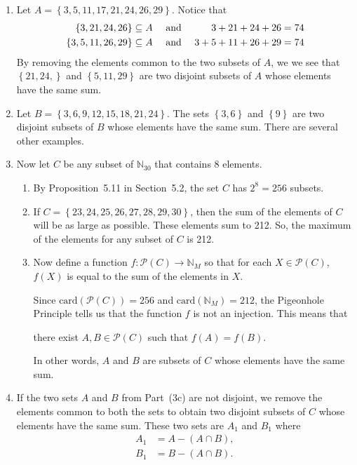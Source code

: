 \documentclass[11pt]{article}
\begin{document}
\begin{enumerate}
\item Let $A = \left\{ 3, 5, 11, 17, 21, 24, 26, 29 \right\}$.  Notice that
\begin{align}
\left\{3, 21, 24, 26 \right\} &\subseteq A \quad \text{ and }   &3 + 21 + 24 + 26 &= 74 \notag \\
\left\{3, 5, 11, 26, 29 \right\} &\subseteq A \quad \text{ and }   &3 + 5 + 11 + 26 + 29 &= 74 \notag
\end{align}
By removing the elements common to the two subsets of $A$, we we see that 
$\left\{21, 24,  \right\}$ and  $\left\{5, 11, 29 \right\}$ are two disjoint subsets of $A$ whose elements have the same sum.

\item Let $B = \left\{ 3, 6, 9, 12, 15, 18, 21, 24 \right\}$.  The sets $\left\{ 3, 6 \right\}$ and $\left\{ 9 \right\}$ are two disjoint subsets of $B$ whose elements have the same sum.  There are several other examples.

\item Now let $C$ be any subset of $\mathbb{N}_{30}$ that contains 8 elements.  
\begin{enumerate}
\item By Proposition~5.11 in Section~5.2, the set $C$ has $2^8 = 256$ subsets.

\item If $C = \left\{23, 24, 25, 26, 27, 28, 29, 30 \right\}$, then the sum of the elements of $C$ will be as large as possible.  These elements sum to 212.  So, the maximum of the elements for any subset of $C$ is 212.

\item Now define a function $f:\mathcal{P} \left( C \right) \to \mathbb{N}_M$ so that for each 
$X \in \mathcal{P} \left( C \right)$, $f \left( X \right)$ is equal to the sum of the elements in $X$.

Since $\text{card} \left( \mathcal{P} \left( C \right) \right) = 256$ and 
$\text{card} \left( \mathbb{N}_M \right) = 212$, the Pigeonhole Principle tells us that the function $f$ is not an injection.  This means that 
\begin{center}
there exist $A, B \in \mathcal{P} \left( C \right)$ such that 
$f \left( A \right) = f \left( B \right)$.
\end{center}
In other words, $A$ and $B$ are subsets of $C$ whose elements have the same sum.
\end{enumerate}

\item If the two sets $A$ and $B$ from Part~(3c) are not disjoint, we remove the elements common to both the sets to obtain two disjoint subsets of $C$ whose elements have the same sum.  These two sets are $A_1$ and $B_1$ where
\[
\begin{aligned}
A_1 &= A - \left( A \cap B \right), \\
B_1 &= B - \left( A \cap B \right).
\end{aligned}
\]



\end{enumerate}
\end{document}
